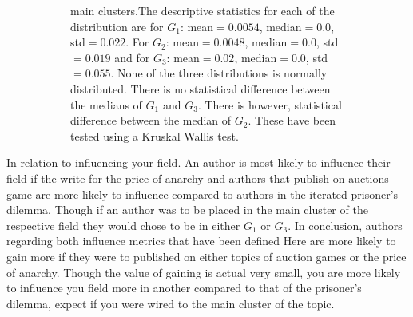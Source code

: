 \documentclass{article}
\theoremstyle{definition}
\begin{document}
\begin{figure}[!hbtp]
\begin{subfigure}{\textwidth}
{        main clusters.The descriptive
        statistics for each of the distribution are for \(G_1\): mean\(=0.0054\),
        median\(=0.0\), std\(=0.022\). For \(G_2\): mean\(=0.0048\), median\(=0.0\),
        std\(=0.019\) and for \(G_3\): mean\(=0.02\), median\(=0.0\), std\(=0.055\).
        None of the three distributions is normally distributed. There is no
        statistical difference between the medians of \(G_1\) and \(G_3\). There
        is however, statistical difference between the median of \(G_2\).
        These have been tested using a Kruskal Wallis test.}\label{fig:betweenness_dist_cluster}
    \end{subfigure}%
\end{figure}

In relation to influencing your field. An author is most likely to influence their
field if the write for the price of anarchy and authors that publish on auctions
game are more likely to influence compared to authors in the iterated prisoner's
dilemma. Though if an author was to be placed in the main cluster of the respective
field they would chose to be in either \(G_1\) or \(G_3\).
In conclusion, authors regarding both influence metrics that have been defined Here
are more likely to gain more if they were to published on either topics of auction
games or the price of anarchy. Though the value of gaining is actual very small,
you are more likely to influence you field more in another compared to that
of the prisoner's dilemma, expect if you were wired to the main cluster of
the topic.
\end{document}
